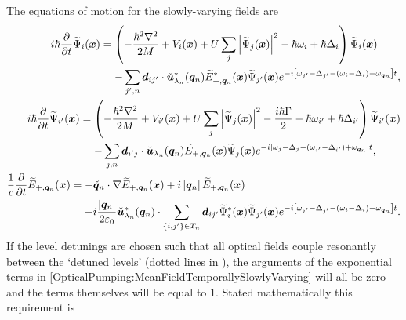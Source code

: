 The equations of motion for the slowly-varying fields are
\begin{subequations}
    \label{OpticalPumping:MeanFieldTemporallySlowlyVarying}
    \begin{align}
        \begin{split}
            i \hbar \frac{\partial}{\partial t} \widetilde{\Psi}_i(\vect{x}) &= \left( -\frac{\hbar^2 \nabla^2}{2M} + V_i(\vect{x}) + U \sum_j \abs{\widetilde{\Psi}_j(\vect{x})}^2 - \hbar \omega_{i} + \hbar \Delta_i \right) \widetilde{\Psi}_i(\vect{x}) \\
            &\relphantom{=} - \sum_{j',n} \vect{d}_{ij'} \cdot \unitvec{u}^*_{\lambda_n}(\vect{q}_n) \widetilde{E}_{+,\vect{q}_n}^*(\vect{x}) \widetilde{\Psi}_{j'}(\vect{x}) e^{-i \left[\omega_{j'} - \Delta_{j'} - (\omega_i - \Delta_i) - \omega_{\vect{q}_n}\right] t},
        \end{split}\\
        \begin{split}
            i \hbar \frac{\partial}{\partial t} \widetilde{\Psi}_{i'}(\vect{x}) &= \left( -\frac{\hbar^2 \nabla^2}{2M} + V_{i'}(\vect{x}) + U \sum_j \abs{\widetilde{\Psi}_j(\vect{x})}^2 - \frac{i\hbar \Gamma}{2} - \hbar \omega_{i'} + \hbar \Delta_{i'}\right) \widetilde{\Psi}_{i'}(\vect{x})\\
            &\relphantom{=} - \sum_{j,n} \vect{d}_{i'j} \cdot \unitvec{u}_{\lambda_n}(\vect{q}_n) \widetilde{E}_{+,\vect{q}_n}(\vect{x}) \widetilde{\Psi}_{j}(\vect{x})  e^{-i \left[\omega_{j} - \Delta_j - (\omega_{i'} - \Delta_{i'}) + \omega_{\vect{q}_n}\right]t},
        \end{split}\\
        \begin{split}
          \frac{1}{c} \frac{\partial}{\partial t} \widetilde{E}_{+, \vect{q}_n} (\vect{x}) &= - \unitvec{q}_n \cdot \nabla \widetilde{E}_{+, \vect{q}_n}(\vect{x}) + i \abs{\vect{q}_n} \widetilde{E}_{+, \vect{q}_n}(\vect{x})\\
          &\relphantom{=} + i \frac{\abs{\vect{q}_n}}{2 \varepsilon_0} \unitvec{u}^*_{\lambda_n}(\vect{q}_n) \cdot \sum_{\{i,j'\}\in T_n} \vect{d}_{ij'} \widetilde{\Psi}^*_i(\vect{x}) \widetilde{\Psi}_{j'}(\vect{x}) e^{-i \left[\omega_{j'} - \Delta_{j'} -(\omega_i - \Delta_i) - \omega_{\vect{q}_n}\right] t}.
        \end{split}
    \end{align}
\end{subequations}
If the level detunings are chosen such that all optical fields couple resonantly between the `detuned levels' (dotted lines in ), the arguments of the exponential terms in \eqref{OpticalPumping:MeanFieldTemporallySlowlyVarying} will all be zero and the terms themselves will be equal to $1$.  Stated mathematically this requirement is
